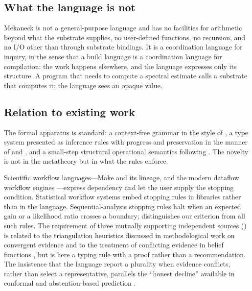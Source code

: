 \documentclass[11pt,a4paper]{article}
\theoremstyle{thmstyle}
\theoremstyle{definition}
\theoremstyle{remark}
\begin{document}
\subsection{What the language is not}

Mekaneck is not a general-purpose language and has no facilities for
arithmetic beyond what the substrate supplies, no user-defined functions, no
recursion, and no I/O other than through substrate bindings. It is a
coordination language for inquiry, in the sense that a build language is a
coordination language for compilation: the work happens elsewhere, and the
language expresses only its structure. A program that needs to compute a
spectral estimate calls a substrate that computes it; the language sees an
opaque value.

\subsection{Relation to existing work}

The formal apparatus is standard: a context-free grammar in the style of
\citet{aho2006}, a type system presented as inference rules with progress
and preservation in the manner of \citet{wright1994} and
\citet{pierce2002}, and a small-step structural operational semantics
following \citet{plotkin1981,kahn1987}. The novelty is not in the metatheory
but in what the rules enforce.

Scientific workflow languages---Make and its lineage, and the modern
dataflow workflow engines \citep{koster2012,direct2017,amstutz2016}---express
dependency and let the user supply the stopping condition. Statistical
workflow systems embed stopping rules in libraries rather than in the
language. Sequential-analysis stopping rules
\citep{wald1945,lindley1956,chaloner1995} halt when an expected gain or a
likelihood ratio crosses a boundary;  distinguishes
our criterion from all such rules. The requirement of three mutually
supporting independent sources () is related to the
triangulation heuristics discussed in methodological work on convergent
evidence \citep{munafo2018} and to the treatment of conflicting evidence in
belief functions \citep{shafer1976}, but is here a typing rule with a proof
rather than a recommendation. The insistence that the language report a
plurality when evidence conflicts, rather than select a representative,
parallels the ``honest decline'' available in conformal and abstention-based
prediction \citep{chow1970,vovk2005}.
\end{document}
